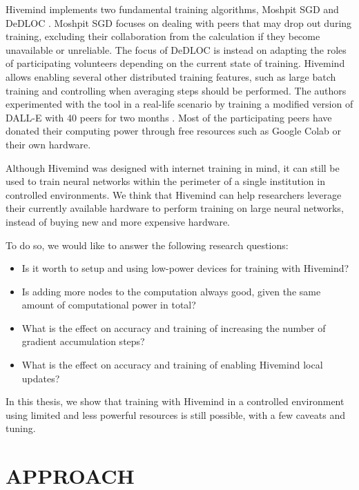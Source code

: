 Hivemind implements two fundamental training algorithms, Moshpit SGD \cite{DBLP:journals/corr/abs-2103-03239} and DeDLOC \cite{DBLP:journals/corr/abs-2106-10207}.
Moshpit SGD focuses on dealing with peers that may drop out during training, excluding their collaboration from the calculation if they become unavailable or unreliable.
The focus of DeDLOC is instead on adapting the roles of participating volunteers depending on the current state of training.
Hivemind allows enabling several other distributed training features, such as large batch training \cite{goyal2017accurate} and controlling when averaging steps should be performed.
The authors experimented with the tool in a real-life scenario by training a modified version of DALL-E \cite{ramesh2021zero} with 40 peers for two months \cite{learning30:online}.
Most of the participating peers have donated their computing power through free resources such as Google Colab or their own hardware.

Although Hivemind was designed with internet training in mind, it can still be used to train neural networks within the perimeter of a single institution in controlled environments.
We think that Hivemind can help researchers leverage their currently available hardware to perform training on large neural networks, instead of buying new and more expensive hardware.

To do so, we would like to answer the following research questions:
\begin{itemize}
    \item Is it worth to setup and using low-power devices for training with Hivemind?
    \item Is adding more nodes to the computation always good, given the same amount of computational power in total?
    \item What is the effect on accuracy and training of increasing the number of gradient accumulation steps?
    \item What is the effect on accuracy and training of enabling Hivemind local updates?
\end{itemize}

In this thesis, we show that training with Hivemind in a controlled environment using limited and less powerful resources is still possible, with a few caveats and tuning.

\section{APPROACH}

